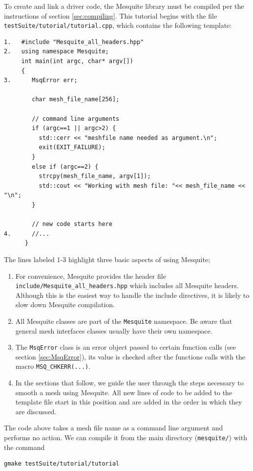 \documentclass[letter]{report}
\begin{document}
To create and link a driver code, the Mesquite library must be
compiled per the instructions of section \ref{sec:compiling}. 
This tutorial begins with the file \newline
\texttt{testSuite/tutorial/tutorial.cpp}, 
which contains the following template:
\begin{verbatim}
1.   #include "Mesquite_all_headers.hpp"
2.   using namespace Mesquite;
     int main(int argc, char* argv[])
     {
3.      MsqError err;
  
        char mesh_file_name[256];
  
        // command line arguments
        if (argc==1 || argc>2) {
          std::cerr << "meshfile name needed as argument.\n";
          exit(EXIT_FAILURE);
        }
        else if (argc==2) {
          strcpy(mesh_file_name, argv[1]);
          std::cout << "Working with mesh file: "<< mesh_file_name << "\n";
        } 

        // new code starts here
4.      //... 
      }
\end{verbatim}
The lines labeled 1-3 highlight three basic aspects of using Mesquite;
\begin{enumerate}
\item For convenience, Mesquite provides the header file
\texttt{include/Mesquite\_all\_headers.hpp} which includes all Mesquite
headers. Although this is the easiest way to handle the include directives,
it is likely to slow down Mesquite compilation.  
\item All Mesquite classes are part of the \texttt{Mesquite} namespace. 
Be aware that general mesh interfaces classes usually have their own
namespace. 
\item  The \texttt{MsqError} class is an error object passed to
certain function calls (see section \ref{sec:MsqError}), its value is
checked after the functions calls with the macro
\texttt{MSQ\_CHKERR(...)}.
\item In the sections that follow, we guide the user through the steps
necessary to smooth a mesh using Mesquite.  All new lines of code to be
added to the template file start in this position and are added in the order
in which they are discussed.
\end{enumerate}

The code above takes a mesh file name as a command line argument and
performs no action. We can compile it from the main directory
(\texttt{mesquite/}) with the command 
\begin{verbatim}
gmake testSuite/tutorial/tutorial
\end{verbatim}
\end{document}

